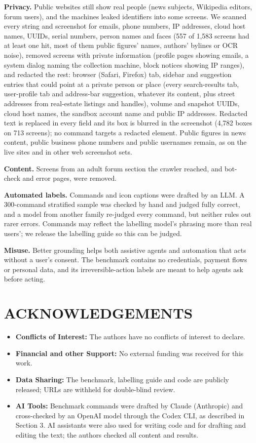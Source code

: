 \documentclass[a4paper,twoside]{article}
\begin{document}
\textbf{Privacy.} Public websites still show real people (news subjects, Wikipedia editors, forum users), and the machines leaked identifiers into some screens. We scanned every string and screenshot for emails, phone numbers, IP addresses, cloud host names, UUIDs, serial numbers, person names and faces (557 of 1,583 screens had at least one hit, most of them public figures' names, authors' bylines or OCR noise), removed screens with private information (profile pages showing emails, a system dialog naming the collection machine, block notices showing IP ranges), and redacted the rest: browser (Safari, Firefox) tab, sidebar and suggestion entries that could point at a private person or place (every search-results tab, user-profile tab and address-bar suggestion, whatever its content, plus street addresses from real-estate listings and handles), volume and snapshot UUIDs, cloud host names, the sandbox account name and public IP addresses. Redacted text is replaced in every field and its box is blurred in the screenshot (4,782 boxes on 713 screens); no command targets a redacted element. Public figures in news content, public business phone numbers and public usernames remain, as on the live sites and in other web screenshot sets.

\textbf{Content.} Screens from an adult forum section the crawler reached, and bot-check and error pages, were removed.

\textbf{Automated labels.} Commands and icon captions were drafted by an LLM. A 300-command stratified sample was checked by hand and judged fully correct, and a model from another family re-judged every command, but neither rules out rarer errors. Commands may reflect the labelling model's phrasing more than real users'; we release the labelling guide so this can be judged.

\textbf{Misuse.} Better grounding helps both assistive agents and automation that acts without a user's consent. The benchmark contains no credentials, payment flows or personal data, and its irreversible-action labels are meant to help agents ask before acting.


\section*{\uppercase{Acknowledgements}}
\begin{itemize}
  \item \textbf{Conflicts of Interest:} The authors have no conflicts of interest to declare.
  \item \textbf{Financial and other Support:} No external funding was received for this work.
  \item \textbf{Data Sharing:} The benchmark, labelling guide and code are publicly released; URLs are withheld for double-blind review.
  \item \textbf{AI Tools:} Benchmark commands were drafted by Claude (Anthropic) and cross-checked by an OpenAI model through the Codex CLI, as described in Section 3. AI assistants were also used for writing code and for drafting and editing the text; the authors checked all content and results.
\end{itemize}


{\small
}
\end{document}
